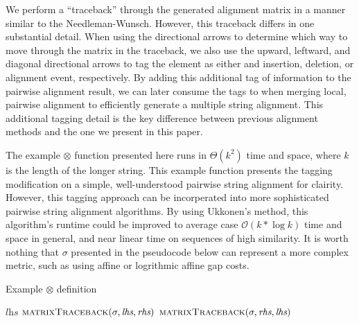 \documentclass[11pt]{article}
\begin{document}
We perform a ``traceback'' through the generated alignment matrix in a manner similar to the  Needleman-Wunsch. 
However, this traceback differs in one substantial detail. When using the directional arrows to determine which way to move through the matrix in the traceback, we also use the upward, leftward, and diagonal directional arrows to tag the element as either and insertion, deletion, or alignment event, respectively. 
By adding this additional tag of information to the pairwise alignment result, we can later consume the tags to when merging local, pairwise alignment to efficiently generate a multiple string alignment.
This additional tagging detail is the key difference between previous alignment methods and the one we present in this paper.

The example $\otimes$ function presented here runs in $\Theta\left( k^2 \right)$ time and space, where $k$ is the length of the longer string. This example function presents the tagging modification on a simple, well-understood pairwise string alignment for clairity. However, this tagging approach can be incorperated into more sophisticated pairwise string alignment algorithms. By using Ukkonen's method, this algorithm's runtime could be improved to average case $\mathcal{O}\left( k * \log k \right)$ time and space in general, and near linear time on sequences of high similarity. It is worth nothing that $\sigma$ presented in the pseudocode below can represent a more complex metric, such as using affine or logrithmic affine gap costs.

\begin{algorithm}
  \caption{Example $\otimes$ definition}\label{pairwiseAlignment}
  \begin{algorithmic}[1]
      \newline
        \State \Return $\textit{lhs}$
        \State \Return $\Call{matrixTraceback}{\sigma, \textit{lhs}, \textit{rhs}}$
      \Else
        \State \Return $\Call{matrixTraceback}{\sigma, \textit{rhs}, \textit{lhs}}$
      \EndIf
    \EndFunction  
  \end{algorithmic}
\end{algorithm}
\end{document}

